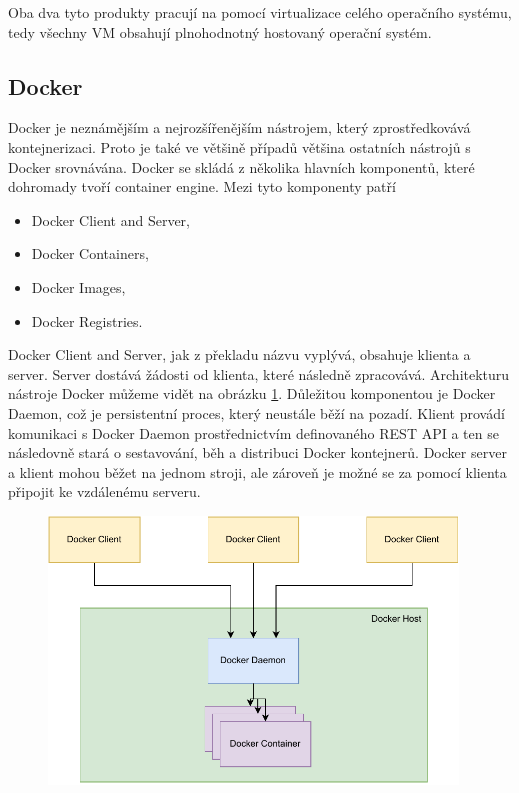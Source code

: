Oba dva tyto produkty pracují na pomocí virtualizace celého operačního systému, tedy všechny VM obsahují plnohodnotný hostovaný operační systém.

\subsection{Docker}
Docker je neznámějším a nejrozšířenějším nástrojem, který zprostředkovává kontejnerizaci. Proto je také ve většině případů většina ostatních nástrojů s Docker srovnávána. Docker se skládá z několika hlavních komponentů, které dohromady tvoří container engine. Mezi tyto komponenty patří

\begin{itemize}
    \item Docker Client and Server,
    \item Docker Containers,
    \item Docker Images,
    \item Docker Registries.
\end{itemize}

Docker Client and Server, jak z překladu názvu vyplývá, obsahuje klienta a server. Server dostává žádosti od klienta, které následně zpracovává. Architekturu nástroje Docker můžeme vidět na obrázku \ref{fig:docker_arch}. Důležitou komponentou je Docker Daemon, což je persistentní proces, který neustále běží na pozadí. Klient provádí komunikaci s Docker Daemon prostřednictvím definovaného REST API a ten se následovně stará o sestavování, běh a distribuci Docker kontejnerů. Docker server a klient mohou běžet na jednom stroji, ale zároveň je možné se za pomocí klienta připojit ke vzdálenému serveru.\,\cite{turnbull2014docker}\cite{docker_overview}

\begin{figure}[htbp]
    \centering 
    \includegraphics[width=0.97\textwidth]{assets/img/docker_arch.pdf}
    \label{fig:docker_arch}
\end{figure}

